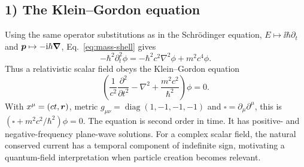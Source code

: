 \subsection*{1) The Klein--Gordon equation}
Using the same operator substitutions as in the Schr\"odinger equation,
$E\mapsto\ii\hbar\partial_t$ and $\bm{p}\mapsto-\mathrm{i}\hbar\bm{\nabla}$,
Eq.~\eqref{eq:mass-shell} gives
\begin{equation}
 -\hbar^2\partial_t^2\phi=-\hbar^2c^2\nabla^2\phi+m^2c^4\phi.
\end{equation}
Thus a relativistic scalar field obeys the Klein--Gordon equation
\begin{equation}\label{eq:kg-handout}
\boxed{\left(\frac1{c^2}\frac{\partial^2}{\partial t^2}-\nabla^2
 +\frac{m^2c^2}{\hbar^2}\right)\phi=0.}
\end{equation}
With $x^\mu=(ct,\bm{r})$, metric $g_{\mu\nu}=\operatorname{diag}(1,-1,-1,-1)$ and $\square=\partial_\mu\partial^\mu$, this is $(\square+m^2c^2/\hbar^2)\phi=0$. The equation is second order in time. It has positive- and negative-frequency plane-wave solutions. For a complex scalar field, the natural conserved current has a temporal component of indefinite sign, motivating a quantum-field interpretation when particle creation becomes relevant.

